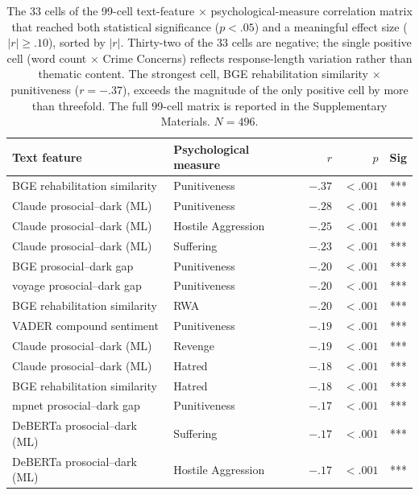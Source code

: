 \begin{table}[htbp]
  \centering
  \caption{The 33 cells of the 99-cell text-feature $\times$ psychological-measure correlation matrix that reached both statistical significance ($p < .05$) and a meaningful effect size ($|r| \geq .10$), sorted by $|r|$. Thirty-two of the 33 cells are negative; the single positive cell (word count $\times$ Crime Concerns) reflects response-length variation rather than thematic content. The strongest cell, BGE rehabilitation similarity $\times$ punitiveness ($r = -.37$), exceeds the magnitude of the only positive cell by more than threefold. The full 99-cell matrix is reported in the Supplementary Materials. $N = 496$.}
  \label{tab:nlp_facade}
  \small
  \begin{tabular}{llrrr}
    \toprule
    Text feature & Psychological measure & $r$ & $p$ & Sig \\
    \midrule
    BGE rehabilitation similarity & Punitiveness        & $-.37$ & $<.001$ & *** \\
    Claude prosocial--dark (ML)   & Punitiveness        & $-.28$ & $<.001$ & *** \\
    Claude prosocial--dark (ML)   & Hostile Aggression  & $-.25$ & $<.001$ & *** \\
    Claude prosocial--dark (ML)   & Suffering           & $-.23$ & $<.001$ & *** \\
    BGE prosocial--dark gap       & Punitiveness        & $-.20$ & $<.001$ & *** \\
    voyage prosocial--dark gap    & Punitiveness        & $-.20$ & $<.001$ & *** \\
    BGE rehabilitation similarity & RWA                 & $-.20$ & $<.001$ & *** \\
    VADER compound sentiment      & Punitiveness        & $-.19$ & $<.001$ & *** \\
    Claude prosocial--dark (ML)   & Revenge             & $-.19$ & $<.001$ & *** \\
    Claude prosocial--dark (ML)   & Hatred              & $-.18$ & $<.001$ & *** \\
    BGE rehabilitation similarity & Hatred              & $-.18$ & $<.001$ & *** \\
    mpnet prosocial--dark gap     & Punitiveness        & $-.17$ & $<.001$ & *** \\
    DeBERTa prosocial--dark (ML)  & Suffering           & $-.17$ & $<.001$ & *** \\
    DeBERTa prosocial--dark (ML)  & Hostile Aggression  & $-.17$ & $<.001$ & *** \\

\end{tabular}
\end{table}
